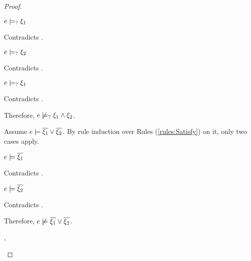 \begin{proof}
\begin{byCases}
\begin{byCases}
\begin{byCases}
        \item[\text{(\ref{rule:CMSAnd1})}]
            \begin{pfsteps*}
            \item $e \models_{?} \xi_1$ 
            \end{pfsteps*}
            Contradicts .
        \item[\text{(\ref{rule:CMSAnd2})}]
            \begin{pfsteps*}
            \item $e \models_{?} \xi_2$ 
            \end{pfsteps*}
            Contradicts .
        \item[\text{(\ref{rule:CMSAnd3})}]
            \begin{pfsteps*}
            \item $e \models_{?} \xi_1$ 
            \end{pfsteps*}
            Contradicts .
        \end{byCases}
        Therefore, $e \not\models_{?} \xi_1 \wedge \xi_2$.
        
        Assume $e \models \overline{\xi_1} \vee \overline{\xi_2}$. By rule induction over Rules (\ref{rules:Satisfy}) on it, only two cases apply.
        \begin{byCases}
        \item[\text{(\ref{rule:CSOr1})}]
            \begin{pfsteps*}
            \item $e \models \overline{\xi_1}$ 
            \end{pfsteps*}
            Contradicts .
        \item[\text{(\ref{rule:CSOr2})}]
            \begin{pfsteps*}
            \item $e \models \overline{\xi_2}$ 
            \end{pfsteps*}
            Contradicts .
        \end{byCases}
        Therefore, $e \not\models \overline{\xi_1} \vee \overline{\xi_2}$.
    
    \item[\csatisfy{e}{\xi_1},\cmaysatisfy{e}{\xi_2}]


\end{byCases}
\end{byCases}
\end{proof}
